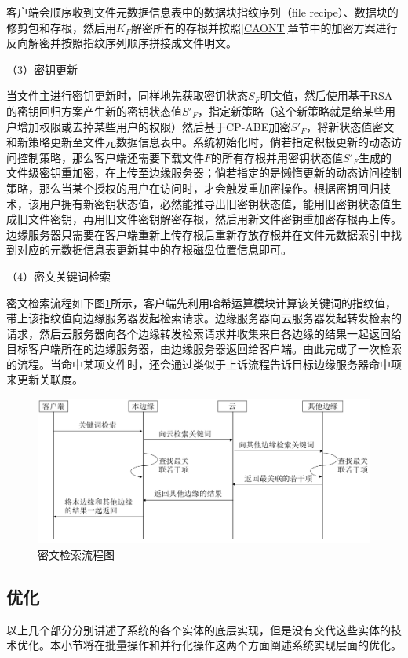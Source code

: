 \documentclass[promaster]{thesis-uestc}
\begin{document}
客户端会顺序收到文件元数据信息表中的数据块指纹序列（file recipe）、数据块的修剪包和存根，然后用$K_F$解密所有的存根并按照\ref{CAONT}章节中的加密方案进行反向解密并按照指纹序列顺序拼接成文件明文。

（3）密钥更新 

当文件主进行密钥更新时，同样地先获取密钥状态$S_F$明文值，然后使用基于RSA的密钥回归方案产生新的密钥状态值$S'_F$，指定新策略（这个新策略就是给某些用户增加权限或去掉某些用户的权限）然后基于CP-ABE加密$S'_F$，将新状态值密文和新策略更新至文件元数据信息表中。系统初始化时，倘若指定积极更新的动态访问控制策略，那么客户端还需要下载文件$F$的所有存根并用密钥状态值$S'_F$生成的文件级密钥重加密，在上传至边缘服务器；倘若指定的是懒惰更新的动态访问控制策略，那么当某个授权的用户在访问时，才会触发重加密操作。根据密钥回归技术，该用户拥有新密钥状态值，必然能推导出旧密钥状态值，能用旧密钥状态值生成旧文件密钥，再用旧文件密钥解密存根，然后用新文件密钥重加密存根再上传。边缘服务器只需要在客户端重新上传存根后重新存放存根并在文件元数据索引中找到对应的元数据信息表更新其中的存根磁盘位置信息即可。

（4）密文关键词检索

密文检索流程如下图\ref{密文检索流程图}所示，客户端先利用哈希运算模块计算该关键词的指纹值，带上该指纹值向边缘服务器发起检索请求。边缘服务器向云服务器发起转发检索的请求，然后云服务器向各个边缘转发检索请求并收集来自各边缘的结果一起返回给目标客户端所在的边缘服务器，由边缘服务器返回给客户端。由此完成了一次检索的流程。当命中某项文件时，还会通过类似于上诉流程告诉目标边缘服务器命中项来更新关联度。


\begin{figure}[htbp]  
    \centering
    \includegraphics[width = 1.0\linewidth]{pic/密文检索流程图.png}
    \caption{密文检索流程图}
    \label{密文检索流程图}
\end{figure}

\subsection{优化}
以上几个部分分别讲述了系统的各个实体的底层实现，但是没有交代这些实体的技术优化。本小节将在批量操作和并行化操作这两个方面阐述系统实现层面的优化。
\end{document}
